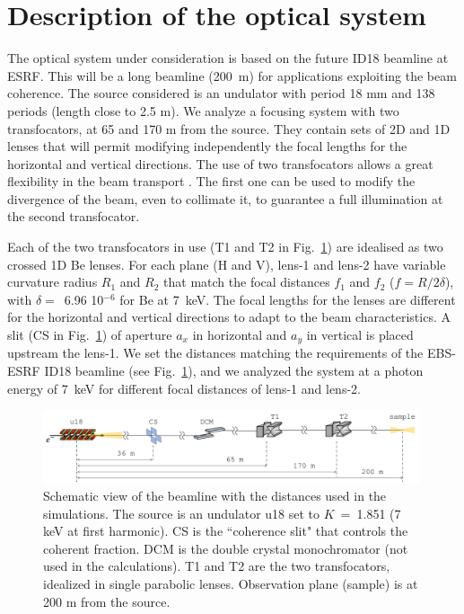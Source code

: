 \documentclass{iucr}              %
\begin{document}
\section{Description of the optical system}
\label{sec:beamline}

The optical system under consideration is based on the future ID18 beamline at ESRF. This will be a long beamline (\SI{200}{\meter}) for applications exploiting the beam coherence. The source considered is an undulator with period 18 mm and 138 periods (length close to 2.5 m).  
We analyze a focusing system with two transfocators, at 65 and 170 m from the source. They contain sets of 2D and 1D lenses that will permit modifying independently the focal lengths for the horizontal and vertical directions. The use of two transfocators allows a great flexibility in the beam transport \cite{Vaughan:kv5084}. The first one can be used to modify the divergence of the beam, even to collimate it, to guarantee a full illumination at the second transfocator.  


Each of the two transfocators in use (T1 and T2 in Fig.~\ref{fig:beamline}) are idealised as two crossed 1D Be lenses. For each plane (H and V),
lens-1 and lens-2 have variable curvature radius $R_1$ and $R_2$ that match the focal distances $f_1$ and $f_2$ ($f=R/2\delta$), with $\delta=$~6.96 10$^{-6}$ for Be at \SI{7}{keV}. 
The focal lengths for the lenses are different for the horizontal and vertical directions to adapt to the beam characteristics.  
A slit (CS in Fig.~\ref{fig:beamline}) of aperture $a_x$ in horizontal and $a_y$ in vertical is placed upstream the lens-1. We set the distances matching the requirements of the EBS-ESRF ID18 beamline (see Fig.~\ref{fig:beamline}), and we analyzed the system at a photon energy of \SI{7}{keV} for different focal distances of lens-1 and lens-2. 
\onecolumn
\begin{figure}\label{fig:beamline}
    \includegraphics[width=0.99\textwidth]{figures/beamline.pdf}
    \caption{Schematic view of the beamline with the distances used in the simulations. The source is an undulator u18 set to $K$~=~1.851 (7 keV at first harmonic). CS is the ``coherence slit" that controls the coherent fraction. DCM is the double crystal monochromator (not used in the calculations). T1 and T2 are the two transfocators, idealized in single parabolic lenses. Observation plane (sample) is at 200 m from the source. 
    }
\end{figure}
\twocolumn
\end{document}
